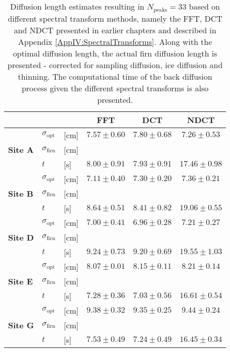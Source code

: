 \documentclass[../../CompleteThesis2/Complete_2ndDraft]{subfiles}
\begin{document}
\begin{table}[ht]
	\centering
	\begin{tabular}{l l l | c | c | c}
		& & & FFT & DCT & NDCT \\
		\hline
		\hline 
		\multirow{3}{*}{\textbf{Site A}} & $\sigma_{\text{opt}}$ & [cm] & $7.57 \pm 0.60$ & $7.80 \pm 0.68$ & $7.26 \pm 0.53$ \\
		& $\sigma_{\text{firn}}$ & [cm] & & & \\
		& $t$ & [s] & $8.00 \pm 0.91$ & $7.93 \pm 0.91$ & $17.46 \pm 0.98$ \\
		\hline
		
		\multirow{3}{*}{\textbf{Site B}} & $\sigma_{\text{opt}}$ & [cm] & $7.11 \pm 0.40$ & $7.30 \pm 0.20$ & $7.36 \pm 0.21$ \\
		& $\sigma_{\text{firn}}$ & [cm] & & & \\
		& $t$ & [s] & $8.64 \pm 0.51$ & $8.41 \pm 0.82$ & $19.06 \pm 0.55$ \\
		\hline
		
		\multirow{3}{*}{\textbf{Site D}} & $\sigma_{\text{opt}}$ & [cm] & $7.00 \pm 0.41$ & $6.96 \pm 0.28$ & $7.21 \pm 0.27$ \\
		& $\sigma_{\text{firn}}$ & [cm] & & & \\
		& $t$ & [s] & $9.24 \pm 0.73$ & $9.20 \pm 0.69$ & $19.55 \pm 1.03$ \\
		\hline
		
		\multirow{3}{*}{\textbf{Site E}} & $\sigma_{\text{opt}}$ & [cm] & $8.07 \pm 0.01$ & $8.15 \pm 0.11$ & $8.21 \pm 0.14$ \\
		& $\sigma_{\text{firn}}$ & [cm] & & & \\
		& $t$ & [s] & $7.28 \pm 0.36$ & $7.03 \pm 0.56$ & $16.61 \pm 0.54$ \\
		\hline
		
		\multirow{3}{*}{\textbf{Site G}} & $\sigma_{\text{opt}}$ & [cm] & $9.38 \pm 0.32$ & $9.35 \pm 0.25$ & $9.44 \pm 0.24$ \\
		& $\sigma_{\text{firn}}$ & [cm] & & & \\
		& $t$ & [s] & $7.53 \pm 0.49$ & $7.24 \pm 0.49$ & $16.45 \pm 0.34$ \\
		\hline
	\end{tabular}
	\caption[$\sigma$ Estimates Given Spectral Transforms]{\small Diffusion length estimates resulting in $N_{\text{peaks}}=33$ based on different spectral transform methods, namely the FFT, DCT and NDCT presented in earlier chapters and described in Appendix \ref{AppIV:SpectralTransforms}. Along with the optimal diffusion length, the actual firn diffusion length is presented - corrected for sampling diffusion, ice diffusion and thinning. The computational time of the back diffusion process given the different spectral transforms is also presented.}
\end{table}
\end{document}
